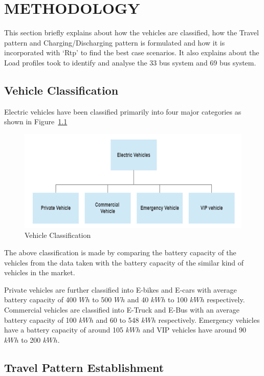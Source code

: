 	\chapter{METHODOLOGY}
	\label{chap:methodology}
	
	This section briefly explains about how the vehicles are classified, how the Travel pattern and Charging/Discharging pattern is formulated and how it is incorporated with `Rtp' to find the best case scenarios. It also explains about the Load profiles took to identify and analyse the 33 bus system and 69 bus system.
	
	\section{Vehicle Classification}
	
	 Electric vehicles have been classified primarily into four major categories as shown in Figure~\ref{fig:classification} 
	 	
			\begin{figure}[h]
				\centering
				\includegraphics[width=0.9\linewidth]{./Figures/classification}
				\caption{Vehicle Classification}
				\label{fig:classification}
			\end{figure}
		
	The above classification is made by comparing the battery capacity of the vehicles from the data taken with the battery capacity of the similar kind of vehicles in the market.

	\par {Private vehicles are further classified into E-bikes and E-cars with average battery capacity of 400 $Wh$ to 500 $Wh$ and 40 $kWh$ to 100 $kWh$ respectively. Commercial vehicles are classified into E-Truck and E-Bus with an average battery capacity of 100 $kWh$ and 60 to 548 $kWh$ respectively. Emergency vehicles have a battery capacity of around 105 $kWh$ and VIP vehicles have around 90 $kWh$ to 200 $kWh$.
	}
	
	\section{Travel Pattern Establishment}
	
